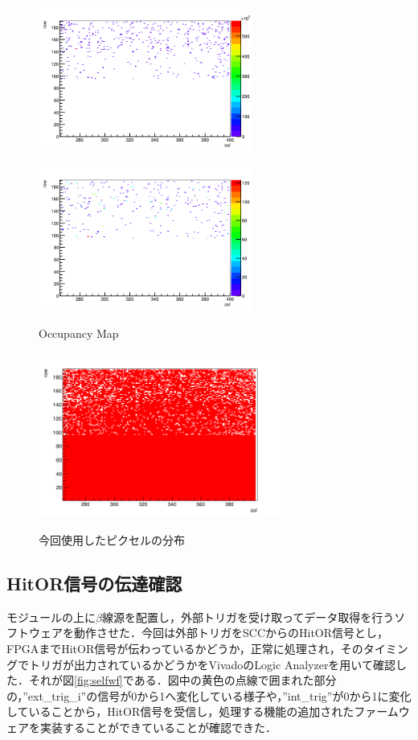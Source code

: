 \begin{figure}[h]
  \centering
  \begin{minipage}[b]{0.45\linewidth}
    \centering
    \includegraphics[width=7cm]{./figure/Noisebf.png}
    \label{fig:bfnoise}
  \end{minipage}
  \begin{minipage}[b]{0.45\linewidth}
    \centering
    \includegraphics[width=7cm]{./figure/Noiseaf.png}
    \label{fig:afnoise}
  \end{minipage}
  \caption{Occupancy Map}
  \label{fig:NoiseOcc}
\end{figure}

\begin{figure}[h]
  \centering
  \includegraphics[width=8cm]{./figure/EnablePix.png}
  \label{fig:enablemap}
  \caption{今回使用したピクセルの分布}
\end{figure}


\subsection{HitOR信号の伝達確認}
モジュールの上に$\beta$線源を配置し，外部トリガを受け取ってデータ取得を行うソフトウェアを動作させた．今回は外部トリガをSCCからのHitOR信号とし，FPGAまでHitOR信号が伝わっているかどうか，正常に処理され，そのタイミングでトリガが出力されているかどうかをVivadoのLogic Analyzerを用いて確認した．それが図\ref{fig:selfwf}である．図中の黄色の点線で囲まれた部分の，''ext\_trig\_i''の信号が0から1へ変化している様子や，''int\_trig''が0から1に変化していることから，HitOR信号を受信し，処理する機能の追加されたファームウェアを実装することができていることが確認できた．

